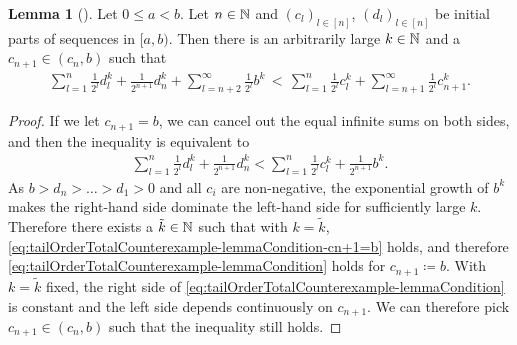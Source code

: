 \documentclass[a4paper,DIV=11,abstracton,twoside=semi]{scrreprt}
\theoremstyle{definition}
\newtheorem{lemma}[thm]{Lemma} %
\begin{document}
    \begin{lemma}[{\cite{bib:epperleinTailOrderTotalCounterexample}}]
        \label{lem:tailOrderTotalCounterexample-lemmaCondition}
        Let $0 \leq a < b$. Let $n \in \mathbb{N}$ and $(c_l)_{l \in [n]}$, $(d_l)_{l \in [n]}$ be initial parts of sequences in $[a, b)$.
        Then there is an arbitrarily large $k \in \mathbb{N}$ and a $c_{n+1} \in (c_n, b)$ such that
        \begin{gather}
            \sum_{l=1}^{n} \frac{1}{2^l} d_l^k + \frac{1}{2^{n+1}} d_n^k + \sum_{l = n+2}^{\infty} \frac{1}{2^l} b^k
            \,<\, \sum_{l=1}^{n} \frac{1}{2^l} c_l^k + \sum_{l = n+1}^{\infty} \frac{1}{2^l} c_{n+1}^k.
            \label{eq:tailOrderTotalCounterexample-lemmaCondition}
        \end{gather}
    \end{lemma}
    \begin{proof}
        If we let $c_{n+1} = b$, we can cancel out the equal infinite sums on both sides, and then the inequality is equivalent to
        \begin{gather}
            \sum_{l=1}^{n} \frac{1}{2^l} d_l^k + \frac{1}{2^{n+1}} d_n^k
            < \sum_{l=1}^{n} \frac{1}{2^l} c_l^k + \frac{1}{2^{n+1}} b^k.
            \label{eq:tailOrderTotalCounterexample-lemmaCondition-cn+1=b}
        \end{gather}
        As $b > d_n > \dots > d_1 > 0$ and all $c_i$ are non-negative, the exponential growth of $b^k$ makes the right-hand side dominate the left-hand side for sufficiently large $k$.
        Therefore there exists a $\tilde{k} \in \mathbb{N}$ such that with $k = \tilde{k}$, \eqref{eq:tailOrderTotalCounterexample-lemmaCondition-cn+1=b} holds, and therefore \eqref{eq:tailOrderTotalCounterexample-lemmaCondition} holds for $c_{n+1} \coloneqq b$.
        With $k = \tilde{k}$ fixed, the right side of \eqref{eq:tailOrderTotalCounterexample-lemmaCondition} is constant and the left side depends continuously on $c_{n+1}$. We can therefore pick $c_{n+1} \in (c_n, b)$ such that the inequality still holds.
    \end{proof}
    
\end{document}
